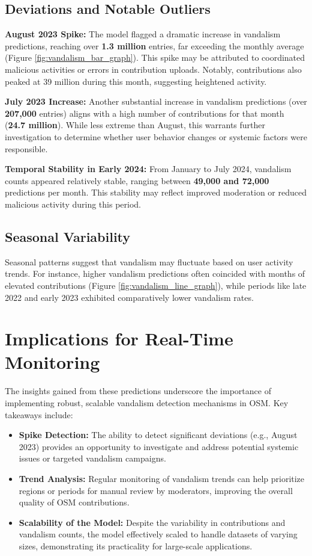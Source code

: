 \documentclass[
    13pt, %
    a4paper, %
    listof=totoc, %
    bibliography=totoc, %
    index=totoc, %
    headsepline
]{scrreprt}
\begin{document}
\subsection{Deviations and Notable Outliers}
\textbf{August 2023 Spike:} The model flagged a dramatic increase in vandalism predictions, reaching over \textbf{1.3 million} entries, far exceeding the monthly average (Figure \ref{fig:vandalism_bar_graph}). This spike may be attributed to coordinated malicious activities or errors in contribution uploads. Notably, contributions also peaked at 39 million during this month, suggesting heightened activity.

\textbf{July 2023 Increase:} Another substantial increase in vandalism predictions (over \textbf{207,000} entries) aligns with a high number of contributions for that month (\textbf{24.7 million}). While less extreme than August, this warrants further investigation to determine whether user behavior changes or systemic factors were responsible.

\textbf{Temporal Stability in Early 2024:} From January to July 2024, vandalism counts appeared relatively stable, ranging between \textbf{49,000 and 72,000} predictions per month. This stability may reflect improved moderation or reduced malicious activity during this period.

\subsection{Seasonal Variability}
Seasonal patterns suggest that vandalism may fluctuate based on user activity trends. For instance, higher vandalism predictions often coincided with months of elevated contributions (Figure \ref{fig:vandalism_line_graph}), while periods like late 2022 and early 2023 exhibited comparatively lower vandalism rates.

\section{Implications for Real-Time Monitoring}
The insights gained from these predictions underscore the importance of implementing robust, scalable vandalism detection mechanisms in OSM. Key takeaways include:
\begin{itemize}
    \item \textbf{Spike Detection:} The ability to detect significant deviations (e.g., August 2023) provides an opportunity to investigate and address potential systemic issues or targeted vandalism campaigns.
    \item \textbf{Trend Analysis:} Regular monitoring of vandalism trends can help prioritize regions or periods for manual review by moderators, improving the overall quality of OSM contributions.
    \item \textbf{Scalability of the Model:} Despite the variability in contributions and vandalism counts, the model effectively scaled to handle datasets of varying sizes, demonstrating its practicality for large-scale applications.
\end{itemize}
\end{document}

